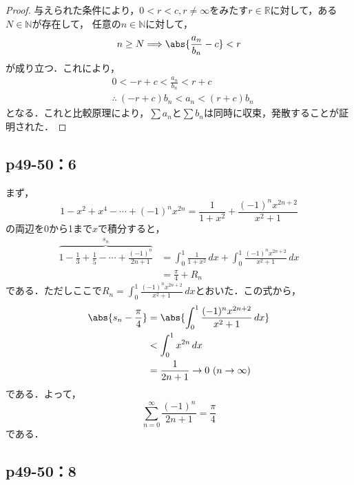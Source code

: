 \documentclass[a4paper,10pt,fleqn]{ltjsarticle}
\begin{document}
    \begin{tleftbar}
        \begin{proof}
            与えられた条件により，$0 <r <c , r \ne \infty $をみたす$r \in \mathbb{R}$に対して，ある$N \in \mathbb{N}$が存在して，
            任意の$n \in \mathbb{N}$に対して，
            \[
                n \ge N \Longrightarrow \abs{\frac{a_n}{b_n}-c}<r
            \]
            が成り立つ．これにより，
            \begin{align*}
                & 0<-r +c < \frac{a_n}{b_n} < r+c \\
                &\therefore ~  (-r+c) b_n < a_n < (r+c) b_n
            \end{align*}
            となる．これと比較原理により，$\sum a_n$と$\sum b_n$は同時に収束，発散することが証明された．
        \end{proof}
    \end{tleftbar}

    \subsection*{p49-50：6}
    \begin{tleftbar}
        まず，
        \[
             1-x^2+x^4-\cdots+(-1)^n x^{2n} =\frac{1}{1+x^2} +\frac{(-1)^n x^{2n+2}}{x^2+1}
        \]
    の両辺を0から1まで$x$で積分すると，
    \begin{align*}
       \overbrace{1-\frac{1}{3}+\frac{1}{5}-\cdots+\frac{(-1)^n}{2n+1}}^{s_n} &=\int_{0}^{1} \frac{1}{1+x^2} \, dx +\int_{0}^{1}\frac{(-1)^n x^{2n+2}}{x^2+1}  \, dx \\
    & = \frac{\pi}{4} + R_n
    \end{align*}
    である．ただしここで$R_n =\int_{0}^{1}\frac{(-1)^n x^{2n+2}}{x^2+1} \, dx$とおいた．この式から，
    \begin{align*}
      \abs{s_n -\frac{\pi}{4}  } & = \abs{\int_{0}^{1}\frac{(-1)^n x^{2n+2}}{x^2+1} \, dx } \\
       & < \int_{0}^{1} x^{2n} \, dx \\
       & =\frac{1}{2n+1} \to 0 ~(n \to \infty)
    \end{align*}
    である．よって，
    \[
        \sum_{n=0}^{\infty} \frac{(-1)^n}{2n+1} =\frac{\pi}{4}
    \]
    である．
    \end{tleftbar}

    \newpage 

    \subsection*{p49-50：8}
\end{document}
